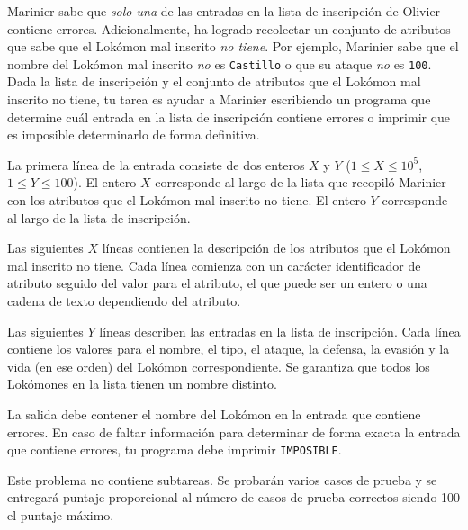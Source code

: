 \documentclass{oci}
\begin{document}
\begin{problemDescription}
Marinier sabe que \emph{solo una} de las entradas en la lista de inscripción
de Olivier contiene errores.
Adicionalmente, ha logrado recolectar un conjunto de atributos que sabe que el Lokómon
mal inscrito \emph{no tiene}.
Por ejemplo, Marinier sabe que el nombre del Lokómon mal inscrito \emph{no} es \texttt{Castillo}
o que su ataque \emph{no} es \texttt{100}.
Dada la lista de inscripción y el conjunto de atributos que el Lokómon
mal inscrito no tiene, tu tarea es ayudar a Marinier escribiendo un programa que determine
cuál entrada en la lista de inscripción contiene errores o imprimir que es imposible
determinarlo de forma definitiva.
\end{problemDescription}

\begin{inputDescription}
La primera línea de la entrada consiste de dos enteros $X$ y $Y$
($1 \leq X \leq 10^5$, $1 \leq Y \leq 100$).
El entero $X$ corresponde al largo de la lista que recopiló Marinier con los atributos
que el Lokómon mal inscrito no tiene.
El entero $Y$ corresponde al largo de la lista de inscripción.

Las siguientes $X$ líneas contienen la descripción de los atributos que el Lokómon mal
inscrito no tiene.
Cada línea comienza con un carácter identificador de atributo seguido del valor para el atributo,
el que puede ser un entero o una cadena de texto dependiendo del atributo.

Las siguientes $Y$ líneas describen las entradas en la lista de inscripción.
Cada línea contiene los valores para el nombre, el tipo, el ataque, la defensa,
la evasión y la vida (en ese orden) del Lokómon correspondiente.
Se garantiza que todos los Lokómones en la lista tienen un nombre distinto.
\end{inputDescription}

\begin{outputDescription}
La salida debe contener el nombre del Lokómon en la entrada que contiene errores.
En caso de faltar información para determinar de forma exacta la entrada que contiene errores,
tu programa debe imprimir \texttt{IMPOSIBLE}.
\end{outputDescription}

\begin{scoreDescription}
Este problema no contiene subtareas.
Se probarán varios casos de prueba y se entregará puntaje proporcional al número
de casos de prueba correctos siendo 100 el puntaje máximo.
\end{scoreDescription}

\begin{sampleDescription}
\end{sampleDescription}
\end{document}
